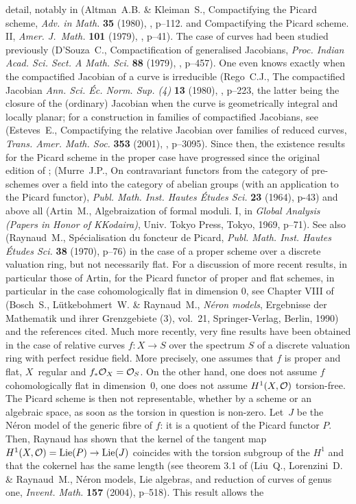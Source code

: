 \begin{remarks}
detail, notably in (Altman~A.B. \& Kleiman~S., {\og Compactifying the Picard scheme\fg}, \emph{Adv. in Math.} \textbf{35} (1980), , p--112. and {\og Compactifying the Picard scheme. II\fg}, \emph{Amer. J.~Math.} \textbf{101} (1979), , p--41). The case of curves had been studied previously (D'Souza~C., {\og Compactification of generalised Jacobians\fg}, \emph{Proc. Indian Acad. Sci. Sect. A Math. Sci.} \textbf{88} (1979), , p--457). One even knows exactly when the compactified Jacobian of a curve is irreducible (Rego~C.J., {\og The compactified Jacobian\fg} \emph{Ann. Sci. \'Ec. Norm. Sup. (4)} \textbf{13} (1980), , p--223, the latter being the closure of the (ordinary) Jacobian when the curve is geometrically integral and locally planar; for a construction in families of compactified Jacobians, see (Esteves~E., {\og Compactifying the relative Jacobian over families of reduced curves\fg}, \emph{Trans. Amer. Math. Soc.} \textbf{353} (2001), , p--3095). Since then, the existence results for the Picard scheme in the proper case have progressed since the original edition of ; \cf (Murre~J.P., {\og On contravariant functors from the category of pre-schemes over a field into the category of abelian groups (with an application to the Picard functor)\fg}, \emph{Publ. Math. Inst. Hautes \'Etudes Sci.} \textbf{23} (1964), p-43) and above all (Artin~M., {\og Algebraization of formal moduli. I\fg}, in \emph{Global Analysis (Papers in Honor of K\ptbl Kodaira)}, Univ. Tokyo Press, Tokyo, 1969, p--71). See also (Raynaud~M., {\og Sp\'ecialisation du foncteur de Picard\fg}, \emph{Publ. Math. Inst. Hautes \'Etudes Sci.} \textbf{38} (1970), p--76) in the case of a proper scheme over a discrete valuation ring, but not necessarily flat. For a discussion of more recent results, in particular those of Artin, for the Picard functor of proper and flat schemes, in particular in the case cohomologically flat in dimension $0$, see Chapter VIII of (Bosch~S., L\"utkebohmert~W. \& Raynaud~M., \emph{N\'eron models}, Ergebnisse der Mathematik und ihrer Grenzgebiete (3), vol.~21, Springer-Verlag, Berlin, 1990) and the references cited. Much more recently, very fine results have been obtained in the case of relative curves $f:X\to S$ over the spectrum $S$ of a discrete valuation ring with perfect residue field. More precisely, one assumes that $f$ is proper and flat, $X$~regular and $f_*\mathcal{O}_X={\mathcal O}_S$. On the other hand, one does not assume $f$ cohomologically flat in dimension~$0$, \ie one does not assume $H^1(X,{\mathcal O})$ torsion-free. The Picard scheme is then not representable, whether by a scheme or an algebraic space, as soon as the torsion in question is non-zero. Let~$J$ be the N\'eron model of the generic fibre of $f$: it is a quotient of the Picard functor $P$. Then, Raynaud has shown that the kernel of the tangent map $H^1(X,\Oo)=\mathrm{Lie}(P)\to \mathrm{Lie}(J)$ coincides with the torsion subgroup of the $H^1$ and that the cokernel has the same length (see theorem 3.1 of (Liu~Q., Lorenzini~D. \& Raynaud~M., {\og N\'eron models, Lie algebras, and reduction of curves of genus one\fg}, \emph{Invent. Math.} \textbf{157} (2004), p--518). This result allows the 
\end{remarks}
